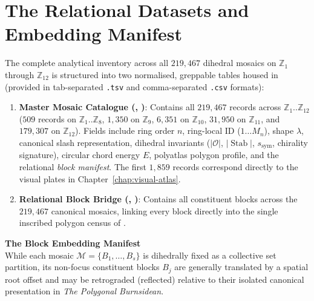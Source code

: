 

\section{The Relational Datasets and Embedding Manifest}
\label{sec:relational-datasets}

The complete analytical inventory across all $219{,}467$ dihedral mosaics on $\mathbb{Z}_1$ through $\mathbb{Z}_{12}$ is structured into two normalised, greppable tables housed in  (provided in tab-separated \texttt{.tsv} and comma-separated \texttt{.csv} formats):

\begin{enumerate}
    \item \textbf{Master Mosaic Catalogue (, )}:
    Contains all $219{,}467$ records across $\mathbb{Z}_1..\mathbb{Z}_{12}$ ($509$ records on $\mathbb{Z}_1..\mathbb{Z}_8$, $1{,}350$ on $\mathbb{Z}_9$, $6{,}351$ on $\mathbb{Z}_{10}$, $31{,}950$ on $\mathbb{Z}_{11}$, and $179{,}307$ on $\mathbb{Z}_{12}$). Fields include ring order $n$, ring-local ID ($1 \dots M_n$), shape $\lambda$, canonical slash representation, dihedral invariants ($|\mathcal{O}|$, $|\operatorname{Stab}|$, $s_{\text{sym}}$, chirality signature), circular chord energy $E$, polyatlas polygon profile, and the relational \emph{block manifest}. The first $1{,}859$ records correspond directly to the visual plates in Chapter~\ref{chap:visual-atlas}.
    
    \item \textbf{Relational Block Bridge (, )}:
    Contains all constituent blocks across the $219{,}467$ canonical mosaics, linking every block directly into the single inscribed polygon census of .
\end{enumerate}

\noindent\textbf{The Block Embedding Manifest}\\[0.4em]
While each mosaic $\mathcal{M} = \{B_1, \dots, B_s\}$ is dihedrally fixed as a collective set partition, its non-focus constituent blocks $B_j$ are generally translated by a spatial root offset and may be retrograded (reflected) relative to their isolated canonical presentation in \emph{The Polygonal Burnsidean}.

